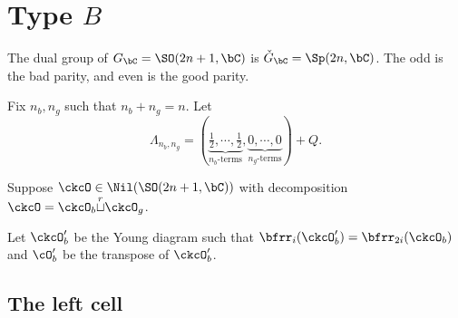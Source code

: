 \documentclass[12pt,a4paper]{amsart}
\newcommand{\sgn}{\operatorname{sgn}}
\numberwithin{equation}{section}
\theoremstyle{remark}
\def\half{{\tfrac{1}{2}}}
\def\ckGc{\check{G}_{\bC}}
\def\Gc{G_\bC}
\def\cuprow{{\stackrel{r}{\sqcup}}}
\begin{document}






\section{Type $B$}

  The dual group of $\Gc = \SO(2n+1,\bC)$ is $\ckGc = \Sp(2n,\bC)$. The odd is
  the bad parity, and even is the good parity.


  Fix $n_{b},n_{g}$ such that $n_{b}+ n_{g} = n$. Let
  \begin{equation} \label{eq:Lam.C}
    \Lambda_{n_{b},n_{g}} = (\underbrace{\half, \cdots, \half}_{n_{b}\text{-terms}}, \underbrace{0, \cdots, 0}_{n_{g}\text{-terms}}) + Q.
  \end{equation}

  Suppose $\ckcO\in \Nil(\SO(2n+1,\bC))$ with decomposition
  $\ckcO = \ckcO_{b}\cuprow \ckcO_{g}$.

  Let $\ckcO'_b$ be the Young diagram such that
  $\bfrr_i(\ckcO'_b) = \bfrr_{2i}(\ckcO_b)$ and $\cO'_{b}$ be the transpose of
  $\ckcO'_{b}$.

  \subsection{The left cell}
\end{document}
